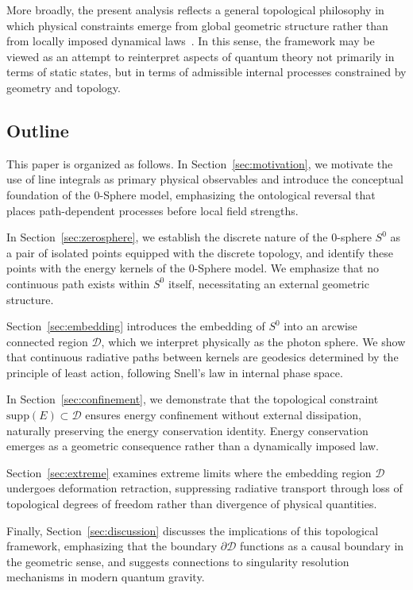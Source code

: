 \documentclass[%
 reprint,
 amsmath,amssymb,
 aps,
 prb,
]{revtex4-2}
\numberwithin{equation}{section}
\begin{document}
More broadly, the present analysis reflects a general topological philosophy in which physical constraints emerge from global geometric structure rather than from locally imposed dynamical laws~\cite{Geroch1970,Frankel2011}.
In this sense, the framework may be viewed as an attempt to reinterpret aspects of quantum theory not primarily in terms of static states, but in terms of admissible internal processes constrained by geometry and topology.

\clearpage

\subsection*{Outline}

This paper is organized as follows.
In Section~\ref{sec:motivation}, we motivate the use of line integrals as primary physical observables and introduce the conceptual foundation of the 0-Sphere model, emphasizing the ontological reversal that places path-dependent processes before local field strengths.

In Section~\ref{sec:zerosphere}, we establish the discrete nature of the 0-sphere $S^0$ as a pair of isolated points equipped with the discrete topology, and identify these points with the energy kernels of the 0-Sphere model. We emphasize that no continuous path exists within $S^0$ itself, necessitating an external geometric structure.

Section~\ref{sec:embedding} introduces the embedding of $S^0$ into an arcwise connected region $\mathcal{D}$, which we interpret physically as the photon sphere. We show that continuous radiative paths between kernels are geodesics determined by the principle of least action, following Snell's law in internal phase space.

In Section~\ref{sec:confinement}, we demonstrate that the topological constraint $\mathrm{supp}(E) \subset \mathcal{D}$ ensures energy confinement without external dissipation, naturally preserving the energy conservation identity. Energy conservation emerges as a geometric consequence rather than a dynamically imposed law.

Section~\ref{sec:extreme} examines extreme limits where the embedding region $\mathcal{D}$ undergoes deformation retraction, suppressing radiative transport through loss of topological degrees of freedom rather than divergence of physical quantities.

Finally, Section~\ref{sec:discussion} discusses the implications of this topological framework, emphasizing that the boundary $\partial\mathcal{D}$ functions as a causal boundary in the geometric sense, and suggests connections to singularity resolution mechanisms in modern quantum gravity.
\end{document}
